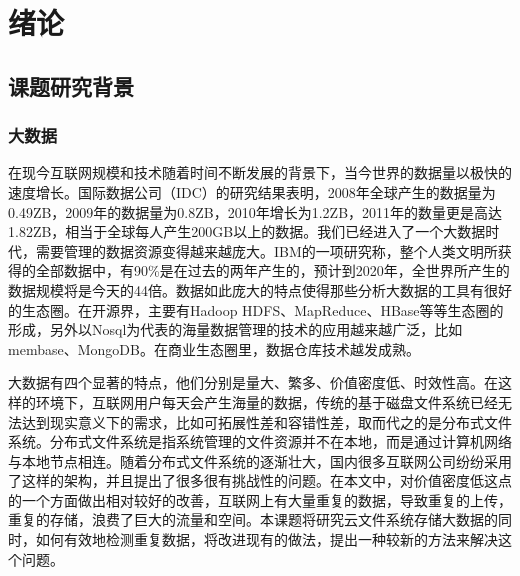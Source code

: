 
\chapter{绪论}
\label{chap:intro}

\section{课题研究背景}
\label{sec:backgroud}

\subsection{大数据}
在现今互联网规模和技术随着时间不断发展的背景下，当今世界的数据量以极快的速度增长。国际数据公司（IDC）的研究结果表明，2008年全球产生的数据量为0.49ZB，2009年的数据量为0.8ZB，2010年增长为1.2ZB，2011年的数量更是高达1.82ZB，相当于全球每人产生200GB以上的数据。我们已经进入了一个大数据时代，需要管理的数据资源变得越来越庞大。IBM的一项研究称，整个人类文明所获得的全部数据中，有90\%是在过去的两年产生的，预计到2020年，全世界所产生的数据规模将是今天的44倍。数据如此庞大的特点使得那些分析大数据的工具有很好的生态圈。在开源界，主要有Hadoop HDFS、MapReduce、HBase等等生态圈的形成，另外以Nosql为代表的海量数据管理的技术的应用越来越广泛，比如membase、MongoDB。在商业生态圈里，数据仓库技术越发成熟。

大数据有四个显著的特点，他们分别是量大、繁多、价值密度低、时效性高。在这样的环境下，互联网用户每天会产生海量的数据，传统的基于磁盘文件系统已经无法达到现实意义下的需求，比如可拓展性差和容错性差，取而代之的是分布式文件系统。分布式文件系统是指系统管理的文件资源并不在本地，而是通过计算机网络与本地节点相连。随着分布式文件系统的逐渐壮大，国内很多互联网公司纷纷采用了这样的架构，并且提出了很多很有挑战性的问题。在本文中，对价值密度低这点的一个方面做出相对较好的改善，互联网上有大量重复的数据，导致重复的上传，重复的存储，浪费了巨大的流量和空间。本课题将研究云文件系统存储大数据的同时，如何有效地检测重复数据，将改进现有的做法，提出一种较新的方法来解决这个问题。

